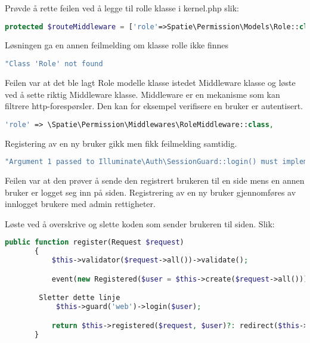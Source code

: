 Prøvde å rette feilen ved å legge til rolle klasse i kernel.php slik:
\begin{lstlisting}[language=PHP]
   protected $routeMiddleware = ['role'=>Spatie\Permission\Models\Role::class];
\end{lstlisting}
Løsningen ga en annen feilmelding om klasse rolle ikke finnes
 \begin{lstlisting}[language=PHP]
      "Class 'Role' not found
 \end{lstlisting}

Feilen var at det ble lagt Role modelle klasse istedet Middleware klasse og løste ved å sette riktig Middleware klasse. Middleware \cite{laravel2019mw} er en mekanisme som kan  filtrere http-forespørsler. Den kan for eksempel verifisere en bruker er autentisert.
\begin{lstlisting}[language=PHP]
   'role' => \Spatie\Permission\Middlewares\RoleMiddleware::class,
\end{lstlisting}

Registering av en ny bruker gikk men fikk feilmelding samtidig.
\begin{lstlisting}[language=PHP]
   "Argument 1 passed to Illuminate\Auth\SessionGuard::login() must implement interface Illuminate\Contracts\Auth\Authenticatable, null given,
\end{lstlisting}

Feilen var at den prøver å sende den registrert brukeren til en side mens en annen  bruker er logget seg inn på siden. Registrering av en ny bruker gjennomføres av innlogget brukere med admin rettigheter.

Løste ved å overskrive og slette koden som sender brukeren til siden. Slik:
\begin{lstlisting}[language=PHP]
   public function register(Request $request)
       {
           $this->validator($request->all())->validate();

           event(new Registered($user = $this->create($request->all())));

        Sletter dette linje
            $this->guard('web')->login($user);

           return $this->registered($request, $user)?: redirect($this->redirectPath());
       }
\end{lstlisting}

\cite{spatie2019aupar}

\clearpage



